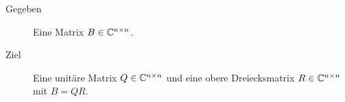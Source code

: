 				\begin{description}
					\item[Gegeben] Eine Matrix \( B \in \mathbb{C}^{n \times n} \).
					\item[Ziel] Eine unitäre Matrix \( Q \in \mathbb{C}^{n \times n} \) und eine obere Dreiecksmatrix \( R \in \mathbb{C}^{n \times n} \) mit \( B = QR \).
				\end{description}

